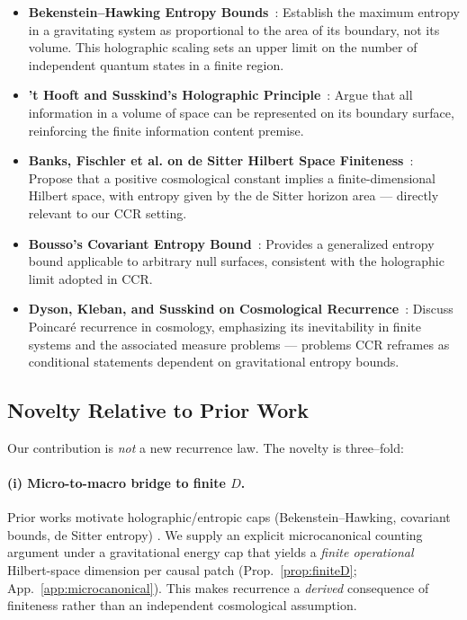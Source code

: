 \documentclass[12pt]{article}
\theoremstyle{remark}
\begin{document}
\begin{itemize}[leftmargin=1.2em]
    \item \textbf{Bekenstein--Hawking Entropy Bounds}~\cite{Bekenstein1973,Hawking1975}: 
    Establish the maximum entropy in a gravitating system as proportional to the area of its boundary, not its volume. This holographic scaling sets an upper limit on the number of independent quantum states in a finite region.

    \item \textbf{'t Hooft and Susskind's Holographic Principle}~\cite{tHooft1993,Susskind1995}:  
    Argue that all information in a volume of space can be represented on its boundary surface, reinforcing the finite information content premise.

    \item \textbf{Banks, Fischler et al. on de Sitter Hilbert Space Finiteness}~\cite{BanksFischler2001,BanksFischler2003}:  
    Propose that a positive cosmological constant implies a finite-dimensional Hilbert space, with entropy given by the de Sitter horizon area — directly relevant to our CCR setting.

    \item \textbf{Bousso’s Covariant Entropy Bound}~\cite{Bousso1999}:  
    Provides a generalized entropy bound applicable to arbitrary null surfaces, consistent with the holographic limit adopted in CCR.

    \item \textbf{Dyson, Kleban, and Susskind on Cosmological Recurrence}~\cite{DysonKlebanSusskind2002}:  
    Discuss Poincaré recurrence in cosmology, emphasizing its inevitability in finite systems and the associated measure problems — problems CCR reframes as conditional statements dependent on gravitational entropy bounds.
\end{itemize}

\subsection{Novelty Relative to Prior Work}
\label{subsec:novelty}
Our contribution is \emph{not} a new recurrence law. The novelty is three–fold:

\paragraph{(i) Micro-to-macro bridge to finite $D$.}
Prior works motivate holographic/entropic caps (Bekenstein–Hawking, covariant bounds, de Sitter entropy) \cite{Bekenstein1973,Hawking1975,Bousso1999}.
We supply an explicit microcanonical counting argument under a gravitational energy cap that yields a \emph{finite operational} Hilbert-space dimension per causal patch (Prop.~\ref{prop:finiteD}; App.~\ref{app:microcanonical}).
This makes recurrence a \emph{derived} consequence of finiteness rather than an independent cosmological assumption.
\end{document}
